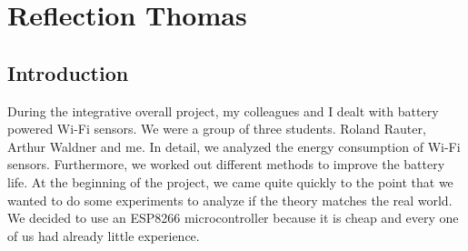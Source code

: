 \chapter*{Reflection Thomas}

\section*{Introduction}
During the integrative overall project, my colleagues and I dealt with battery powered Wi-Fi sensors. We were a group of three students. Roland Rauter, Arthur Waldner and me. In detail, we analyzed the energy consumption of Wi-Fi sensors. Furthermore, we worked out different methods to improve the battery life. At the beginning of the project, we came quite quickly to the point that we wanted to do some experiments to analyze if the theory matches the real world. We decided to use an ESP8266 microcontroller because it is cheap and every one of us had already little experience. 

